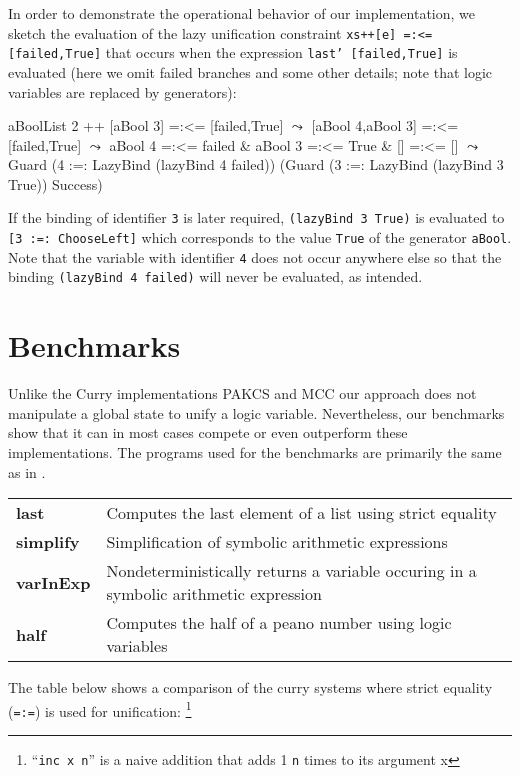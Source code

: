 \documentclass{llncs}
\newcommand{\code}[1]{\mbox{\small\texttt{#1}}}
\newcommand{\ccode}[1]{``\code{#1}''}
\begin{document}
In order to demonstrate the operational behavior of our implementation,
we sketch the evaluation of the lazy unification constraint
\code{xs++[e] =:<= [failed,True]} that occurs when the expression
\code{last' [failed,True]} is evaluated (here we omit failed branches
and some other details; note that logic variables are replaced
by generators):
\begin{haskell}
  aBoolList 2 ++ [aBool 3] =:<= [failed,True]
  $\leadsto$ [aBool 4,aBool 3] =:<= [failed,True]
  $\leadsto$ aBool 4 =:<= failed & aBool 3 =:<= True & [] =:<= []
  $\leadsto$ Guard (4 :=: LazyBind (lazyBind 4 failed))
           (Guard (3 :=: LazyBind (lazyBind 3 True)) Success)
\end{haskell}
If the binding of identifier \code{3} is later required,
\code{(lazyBind 3 True)} is evaluated to \code{[3 :=: ChooseLeft]}
which corresponds to the value \code{True} of the generator \code{aBool}.
Note that the variable with identifier \code{4} does not occur
anywhere else so that the binding \code{(lazyBind 4 failed)}
will never be evaluated, as intended.


         
\section{Benchmarks}
\label{sec:Benchmarks}

Unlike the Curry implementations PAKCS and MCC our approach does
not manipulate a global state to unify a logic variable. Nevertheless,
our benchmarks show that it can in most cases
compete or even outperform these implementations.
The programs used for the benchmarks are primarily the same as in \cite{AntoyHanus05LOPSTR}.

\begin{tabular}{l l}
\bf{last}& Computes the last element of a list using strict equality\\
\bf{simplify}& Simplification of symbolic arithmetic expressions\\
\bf{varInExp}& Nondeterministically returns a variable occuring
                in a symbolic arithmetic expression \\
\bf{half}& Computes the half of a peano number using logic variables\\
\end{tabular}

The table below shows a comparison of the curry systems where
strict equality (\code{=:=}) is used for unification:
\footnote{\ccode{inc x n} is a naive addition that adds 1 \code{n} times
          to its argument x }
 
\end{document}
